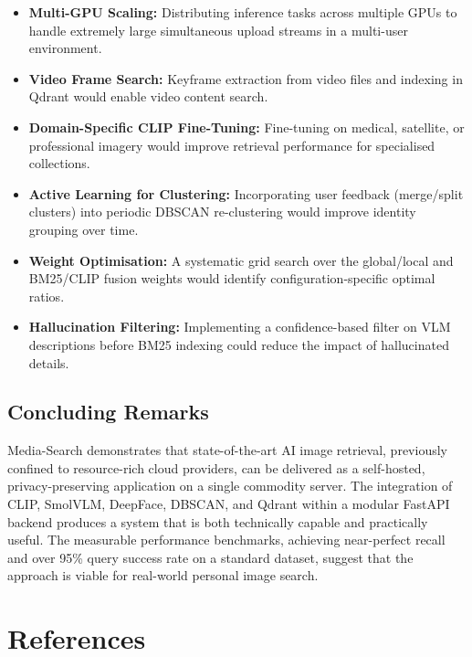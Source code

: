 \documentclass[12pt,a4paper,oneside]{report}
\begin{document}
\begin{itemize}[leftmargin=*]
  \item \textbf{Multi-GPU Scaling:} Distributing inference tasks across multiple GPUs to handle extremely large simultaneous upload streams in a multi-user environment.
  \item \textbf{Video Frame Search:} Keyframe extraction from video files and indexing in Qdrant would enable video content search.
  \item \textbf{Domain-Specific CLIP Fine-Tuning:} Fine-tuning on medical, satellite, or professional imagery would improve retrieval performance for specialised collections.
  \item \textbf{Active Learning for Clustering:} Incorporating user feedback (merge/split clusters) into periodic DBSCAN re-clustering would improve identity grouping over time.
  \item \textbf{Weight Optimisation:} A systematic grid search over the global/local and BM25/CLIP fusion weights would identify configuration-specific optimal ratios.
  \item \textbf{Hallucination Filtering:} Implementing a confidence-based filter on VLM descriptions before BM25 indexing could reduce the impact of hallucinated details.
\end{itemize}

\section{Concluding Remarks}

Media-Search demonstrates that state-of-the-art AI image retrieval, previously confined to resource-rich cloud providers, can be delivered as a self-hosted, privacy-preserving application on a single commodity server. The integration of CLIP, SmolVLM, DeepFace, DBSCAN, and Qdrant within a modular FastAPI backend produces a system that is both technically capable and practically useful. The measurable performance benchmarks, achieving near-perfect recall and over 95\% query success rate on a standard dataset, suggest that the approach is viable for real-world personal image search.


\chapter*{References}
\end{document}
